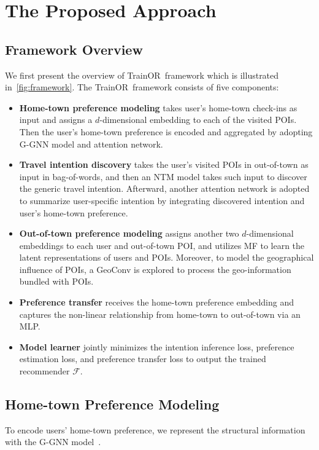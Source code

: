 \documentclass[letterpaper]{article} %
\newcommand{\ourmodel}{{\sc TrainOR}}
\begin{document}
\section{The Proposed Approach}

\subsection{Framework Overview}
We first present the overview of \ourmodel~framework which is illustrated in~\cref{fig:framework}.
The \ourmodel ~framework consists of five components:

\begin{itemize}
    \item
    {\bf Home-town preference modeling}
    takes user's home-town check-ins as input and assigns a $d$-dimensional embedding to each of the visited POIs.
    Then the user's home-town preference is encoded and aggregated by adopting G-GNN model and attention network.
    \item
    {\bf Travel intention discovery}
    takes the user's visited POIs in out-of-town as input in bag-of-words, and then an NTM model takes such input to discover the generic travel intention.
    Afterward, another attention network is adopted to summarize user-specific intention by integrating discovered intention and user's home-town preference.
    \item
    {\bf Out-of-town preference modeling}
    assigns another two $d$-dimensional embeddings to each user and  out-of-town POI, and utilizes MF to learn the latent representations of users and POIs.
    Moreover, to model the geographical influence of POIs, a GeoConv is explored to process the geo-information bundled with POIs.
    \item
    {\bf Preference transfer}
    receives the home-town preference embedding and captures the non-linear relationship from home-town to out-of-town via an MLP.
    \item
    {\bf Model learner} jointly minimizes the intention inference loss, preference estimation loss, and preference transfer loss to output the trained recommender $ \mathcal{F} $.
\end{itemize}


\subsection{Home-town Preference Modeling}
To encode users' home-town preference, we represent the structural information with the G-GNN model~\cite{wu2019session,li2015gated}.
\end{document}
